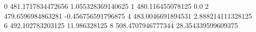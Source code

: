 0 481.1717834472656 1.055328369140625
1 480.116455078125 0.0
2 479.6596984863281 -0.456756591796875
4 483.0046691894531 2.888214111328125
6 492.102783203125 11.986328125
8 508.4707946777344 28.354339599609375
